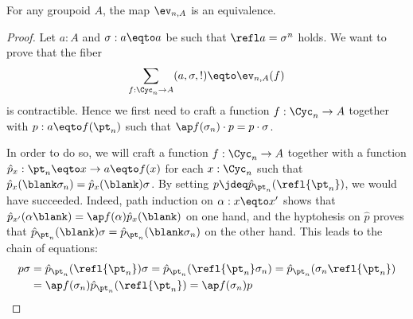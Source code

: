 \begin{theorem}
  For any groupoid $A$, the map $\ev_{n,A}$ is an equivalence.
  \label{prop:ump-cycn-into-groupoids}
\end{theorem}
\begin{proof}
  Let $a:A$ and $\sigma:a\eqto a$ be such that $\refl a = \sigma^n$ holds.
  We want to prove that the fiber
  \begin{displaymath}
    \sum_{f:\Cyc_n \to A} (a,\sigma, !) \eqto \ev_{n,A}(f)
  \end{displaymath}
  is contractible. Hence we first need to craft a function $f:\Cyc_n \to A$
  together with $p:a\eqto f(\pt_n)$ such that $\ap f (\sigma_n) \cdot p = p
  \cdot \sigma$.

  In order to do so, we will craft a function $f:\Cyc_n \to A$ together with a
  function $\hat p_x: \pt_n \eqto x \to a \eqto f(x)$ for each $x:\Cyc_n$ such that
  $\hat p_x(\blank\sigma_n) = \hat p_x(\blank) \sigma$. By setting $p \jdeq \hat
  p_{\pt_n}(\refl {\pt_n})$, we would have succeeded. Indeed, path induction on
  $\alpha: x \eqto x'$ shows that $\hat p_{x'}(\alpha \blank) = \ap f (\alpha) \hat
  p_x(\blank)$ on one hand, and the hyptohesis on $\hat p$ proves that $\hat
  p_{\pt_n} (\blank) \sigma = \hat p_{\pt_n}(\blank \sigma_n)$ on the other
  hand. This leads to the chain of equations:
  \begin{align*}
    p \sigma &= \hat p_{\pt_n}(\refl {\pt_n}) \sigma
               = \hat p_{\pt_n}(\refl {\pt_n}\sigma_n)
               = \hat p_{\pt_n}(\sigma_n\refl {\pt_n}) \\
             &= \ap f (\sigma_n) \hat p_{\pt_n}(\refl {\pt_n})
               = \ap f (\sigma_n) p
  \end{align*}


\end{proof}
